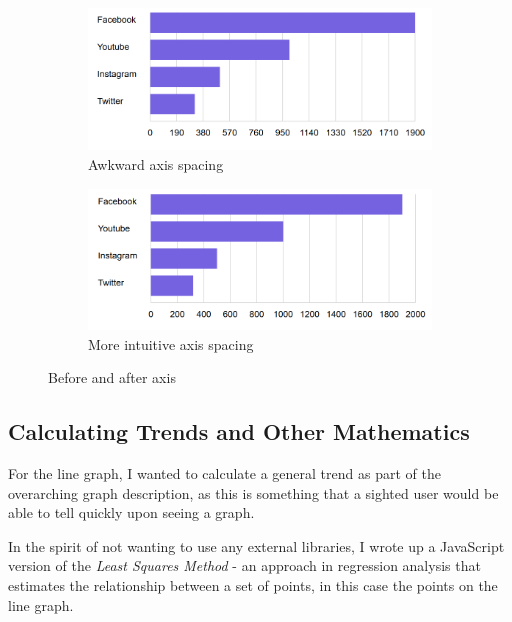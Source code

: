 \documentclass[ %
                    author={Aleena Baig},
                supervisor={Dr Simon Lock},
                    degree={BSc},
                     title={On Making Web Accessible Graphs},
                  subtitle={},
                      year={2019} ]{dissertation}
\begin{document}
\begin{figure}[h]
  \centering
  \begin{subfigure}[b]{0.4\linewidth}
    \includegraphics[width=\linewidth]{images/awkwardAxis.PNG}
     \caption{Awkward axis spacing}
  \end{subfigure}
  \begin{subfigure}[b]{0.4\linewidth}
    \includegraphics[width=\linewidth]{images/lessAwkwardAxis.PNG}
    \caption{More intuitive axis spacing}
  \end{subfigure}
  \caption{Before and after axis}
  \label{fig:Awkwardsaxis}
\end{figure}

\subsection{Calculating Trends and Other Mathematics}

For the line graph, I wanted to calculate a general trend as part of the overarching graph description, as this is something that a sighted user would be able to tell quickly upon seeing a graph.

In the spirit of not wanting to use any external libraries, I wrote up a JavaScript version of the \textit{Least Squares Method} -  an approach in regression analysis that estimates the relationship between a set of points, in this case the points on the line graph.
\end{document}

